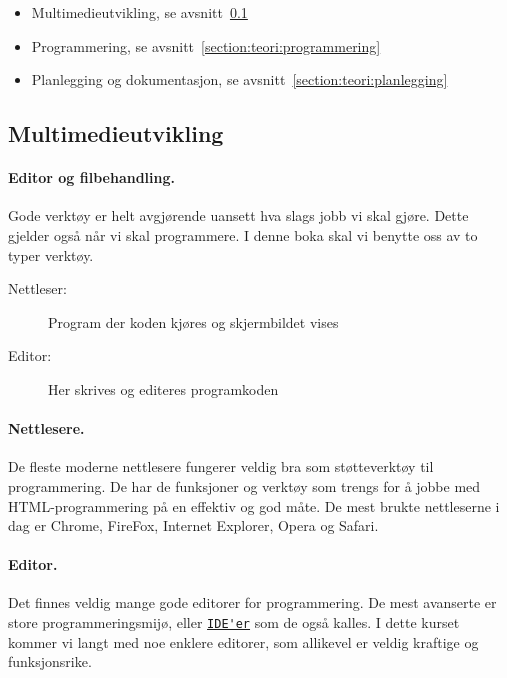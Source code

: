 \documentclass[%
oneside,                 %
final,                   %
10pt]{article}
\begin{document}
\begin{itemize}
\item Multimedieutvikling, se avsnitt~\ref{section:teori:multimedieutvikling}

\item Programmering, se avsnitt~\ref{section:teori:programmering}

\item Planlegging og dokumentasjon, se avsnitt~\ref{section:teori:planlegging}
\end{itemize}

\noindent

\subsection{Multimedieutvikling}
\label{section:teori:multimedieutvikling}

\paragraph{Editor og filbehandling.}
\label{section:teori:editorogfilbehandling}

Gode verktøy er helt avgjørende uansett hva slags jobb vi skal
gjøre. Dette gjelder også når vi skal programmere. I denne boka
skal vi benytte oss av to typer verktøy.

\begin{description}
\item[Nettleser:] 
  Program der koden kjøres og skjermbildet vises

\item[Editor:] 
  Her skrives og editeres programkoden 
\end{description}

\noindent
\paragraph{Nettlesere.}

De fleste moderne nettlesere fungerer veldig bra som støtteverktøy
til programmering. De har de funksjoner og verktøy som trengs for å
jobbe med HTML-programmering på en effektiv og god måte. De mest
brukte nettleserne i dag er Chrome, FireFox, Internet Explorer, Opera
og Safari.

\paragraph{Editor.}

Det finnes veldig mange gode editorer for programmering. De mest
avanserte er store programmeringsmijø, eller
\href{{http://en.wikipedia.org/wiki/Integrated_development_environment}}{\nolinkurl{IDE'er}}
som de også kalles. I dette kurset kommer vi langt med noe enklere
editorer, som allikevel er veldig kraftige og funksjonsrike.
\end{document}
